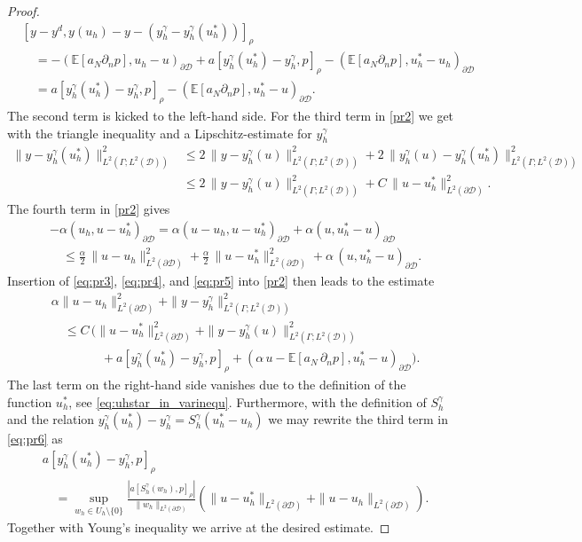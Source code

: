 \documentclass[a4paper,10pt]{article}
\newcommand{\cD}{{\mathcal{D}}}
\newcommand{\E}{{\mathbb{E}}}
\newcommand{\yL}{{L^2(\Gamma;L^2(\cD))}}
\numberwithin{theorem}{section}
\begin{document}
\begin{proof}
\begin{align}\label{eq:pr3}
	&[y - y^d, y(u_h) - y -  ( y_h^{\gamma} - y_h^{\gamma}(u_h^*) ) ]_{\rho}	\nonumber\\
	&\quad = - (\E[a_N \partial_n p], u_h - u)_{\partial\cD} + a[y_h^\gamma(u_h^*) - y_h^\gamma, p]_{\rho}
	- (\E[a_N \partial_n p], u_h^* - u_h)_{\partial\cD} \nonumber\\
	&\quad = a[y_h^\gamma(u_h^*) - y_h^\gamma, p]_{\rho} - (\E[a_N\partial_n p], u_h^* - u)_{\partial\cD}.
\end{align}
The second term is kicked to the left-hand side.
For the third term in \eqref{pr2} we get with the triangle inequality and a Lipschitz-estimate for $y_h^\gamma$ \cite[Thm.~2.2]{ECasas_JPRaymond_2006b}
\begin{align}\label{eq:pr4}
	\|y-y_h^\gamma(u_h^*)\|_{L^2(\Gamma;L^2(\cD))}^2
	&\le 2\,\|y-y_h^\gamma(u)\|_{L^2(\Gamma;L^2(\cD))}^2 + 2\,\|y_h^\gamma(u) - y_h^\gamma(u_h^*)\|_{L^2(\Gamma;L^2(\cD))}^2 \nonumber\\
	&\le 2\,\|y-y_h^\gamma(u)\|_{L^2(\Gamma;L^2(\cD))}^2 + C\,\|u - u_h^*\|_{L^2(\partial\cD)}^2.	
\end{align}
The fourth term in \eqref{pr2} gives
\begin{align}\label{eq:pr5}
	&-\alpha(u_h, u-u_h^*)_{\partial\cD} = \alpha(u - u_h, u-u_h^*)_{\partial\cD} + \alpha(u, u_h^* - u)_{\partial\cD} \nonumber \\
	&\quad\le \frac\alpha2\,\|u-u_h\|_{L^2(\partial\cD)}^2
	+ \frac\alpha2\,\|u-u_h^*\|_{L^2(\partial\cD)}^2
	+ \alpha\,(u, u_h^*-u)_{\partial\cD}.
\end{align}
Insertion of \eqref{eq:pr3}, \eqref{eq:pr4}, and \eqref{eq:pr5} into \eqref{pr2} then leads to the estimate
\begin{align}\label{eq:pr6}
	&\alpha\|u-u_h\|_{L^2(\partial \cD)}^2 + \|y - y_h^{\gamma}\|_{\yL}^2 \nonumber\\
	&\quad \le C\,\Big(\|u - u_h^*\|_{L^2(\partial\cD)}^2 + \|y-y_h^\gamma(u)\|_{L^2(\Gamma;L^2(\cD))}^2 \nonumber \\
	&\qquad \qquad + a[y_h^\gamma(u_h^*) - y_h^\gamma, p]_{\rho} + (\alpha\,u - \E[a_N\,\partial_n p], u_h^* - u)_{\partial\cD}\Big).
\end{align}
The last term on the right-hand side vanishes due to the definition of the function $u_h^*$, see \eqref{eq:uhstar_in_varinequ}. Furthermore, with the definition of $S_h^\gamma$ and the relation $y_h^\gamma(u_h^*) - y_h^\gamma = S_h^\gamma(u_h^* - u_h)$ we may rewrite the third term in \eqref{eq:pr6} as
\begin{align*}
	& a[y_h^\gamma(u_h^*) - y_h^\gamma, p]_{\rho} \nonumber \\
    & \quad =	\sup_{w_h\in U_h \setminus\{0\}} \frac{|a[S_h^\gamma(w_h), p]_{\rho}|}{\|w_h\|_{L^2(\partial \cD)}}
	\left(\|u-u_h^*\|_{L^2(\partial \cD)} + \|u - u_h\|_{L^2(\partial \cD)}\right).
\end{align*}
Together with Young's inequality we arrive at the desired estimate.



\end{proof}
\end{document}
